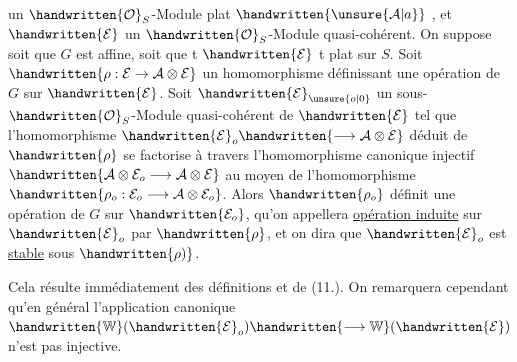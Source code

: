 un $\handwritten{\mathcal{O}}_S$-Module plat $\handwritten{\unsure{\mathcal{A}|a}}$ , et $\handwritten{\mathcal{E}}$ un $\handwritten{\mathcal{O}}_S$-Module quasi-cohérent. On suppose soit que $G$ est affine, soit que t $\handwritten{\mathcal{E}}$ t plat sur $S$. Soit $\handwritten{\rho:\mathcal{E}\to\mathcal{A}\otimes\mathcal{E}}$ un homomorphisme définissant une opération de $G$ sur $\handwritten{\mathcal{E}}$. Soit $\handwritten{\mathcal{E}}_{\unsure{o|0}}$ un sous-$\handwritten{\mathcal{O}}_S$-Module quasi-cohérent de $\handwritten{\mathcal{E}}$ tel que l'homomorphisme $\handwritten{\mathcal{E}}_o\handwritten{\longrightarrow\mathcal{A}\otimes\mathcal{E}}$ déduit de $\handwritten{\rho}$ se factorise à travers l'homomorphisme canonique \handwritten{(}injectif $\handwritten{\mathcal{A}\otimes\mathcal{E}_o\longrightarrow\mathcal{A}\otimes\mathcal{E}}$ au moyen de l'homomorphisme $\handwritten{\rho_o:\mathcal{E}_o\longrightarrow\mathcal{A}\otimes\mathcal{E}_o}$. Alors $\handwritten{\rho_o}$ définit une opération de $G$ sur $\handwritten{\mathcal{E}_o}$\handwritten{(},\handwritten{(} qu'on appellera \uline{opération induite} sur $\handwritten{\mathcal{E}}_o$ par $\handwritten{\rho}$, et on dira que $\handwritten{\mathcal{E}}_o$ est \uline{stable} sous $\handwritten{\rho)}$.

Cela résulte immédiatement des définitions et de (11.). On remarquera cependant qu'en général l'application canonique $\handwritten{\mathbb{W}}(\handwritten{\mathcal{E}}_o)\handwritten{\longrightarrow\mathbb{W}}(\handwritten{\mathcal{E}})$ n'est pas injective.


